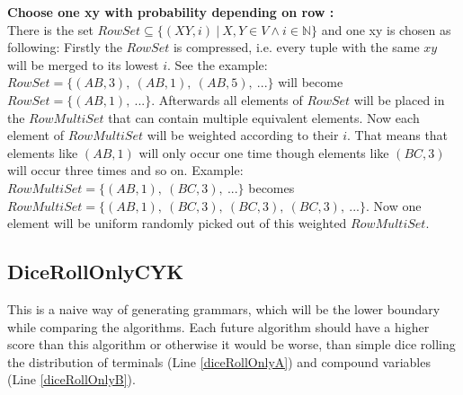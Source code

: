 \noindent \textbf{Choose one xy with probability depending on row  :}\\
There is the set $RowSet \subseteq \{(XY,i)\ |\ X,Y \in V \wedge i \in \mathbb{N} \}$ and one xy is chosen as following:
Firstly the $RowSet$ is compressed, i.e. every tuple with the same $xy$ will be merged to its lowest $i$. See the example: $RowSet = \{(AB,3),~(AB,1),~(AB,5),~... \}$ will become $RowSet = \{(AB,1),~... \}$. Afterwards all elements of $RowSet$ will be placed in the $RowMultiSet$ that  can contain multiple equivalent elements. Now each element of $RowMultiSet$ will be weighted according to their $i$. That means that elements like $(AB,1)$ will only occur one time though elements like $(BC,3)$ will occur three times and so on. Example: $RowMultiSet = \{(AB,1),~(BC,3),~...\}$ becomes $RowMultiSet = \{(AB,1),~(BC,3),~(BC,3),~(BC,3),~...\}$. Now one element will be uniform randomly picked out of this weighted $RowMultiSet$.\\



\subsection{DiceRollOnlyCYK}
\noindent This is a naive way of generating grammars, which will be the lower boundary while comparing the algorithms. Each future algorithm should have a higher score than this algorithm or otherwise it would be worse, than simple dice rolling the distribution of terminals (Line \ref{diceRollOnlyA}) and compound variables (Line \ref{diceRollOnlyB}). \\

